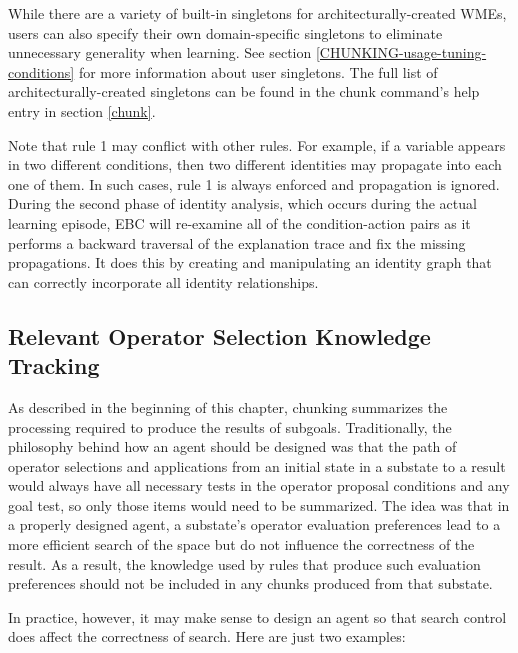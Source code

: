 \begin{enumerate}
\begin{enumerate}
		While there are a variety of built-in singletons for architecturally-created WMEs, users can also specify their own domain-specific singletons to eliminate unnecessary generality when learning.  See section \ref{CHUNKING-usage-tuning-conditions} for more information about user singletons.  The full list of architecturally-created singletons can be found in the chunk command's help entry in section \ref{chunk}.
	\end{enumerate}
\end{enumerate}

Note that rule 1 may conflict with other rules.  For example, if a variable appears in two different conditions, then two different identities may propagate into each one of them.  In such cases, rule 1 is always enforced and propagation is ignored. During the second phase of identity analysis, which occurs during the actual learning episode, EBC will re-examine all of the condition-action pairs as it performs a backward traversal of the explanation trace and fix the missing propagations.  It does this by creating and manipulating an identity graph that can correctly incorporate all identity relationships.

\subsection{Relevant Operator Selection Knowledge Tracking}
\label{CHUNKING-prior-osk}

As described in the beginning of this chapter, chunking summarizes the processing required to produce the results of subgoals. Traditionally, the philosophy behind how an agent should be designed was that the path of operator selections and applications from an initial state in a substate to a result would always have all necessary tests in the operator proposal conditions and any goal test, so only those items would need to be summarized. The idea was that in a properly designed agent, a substate's operator evaluation preferences lead to a more efficient search of the space but do not influence the correctness of the result. As a result, the knowledge used by rules that produce such evaluation preferences should not be included in any chunks produced from that substate.

In practice, however, it may make sense to design an agent so that search control does affect the correctness of search. Here are just two examples:

